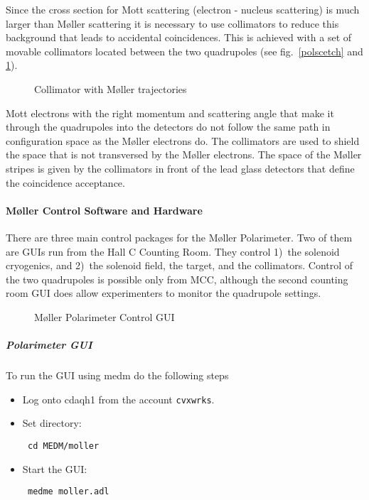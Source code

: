 Since the cross section for Mott scattering (electron - nucleus
scattering) is much larger than M\o ller scattering it is necessary
to use collimators to reduce this background that leads to accidental
coincidences. This is achieved with a set of movable collimators
located between the two quadrupoles (see fig.~\ref{polscetch} 
and \ref{colscetch}). 
%
\begin{figure}
\begin{center}
\caption{Collimator with M\o ller trajectories\label{colscetch}}
\end{center}
\end{figure}
Mott electrons with the right momentum and scattering angle that make it
through the quadrupoles into the detectors do not follow the same
path in configuration space as 
the M\o ller electrons do.  The collimators are used to shield the
space that is not transversed by the M\o ller electrons. The space of
the M\o ller stripes is  
given by the collimators in front of the lead glass detectors
that define the coincidence acceptance.
%

\paragraph{M\o ller Control Software and Hardware}
There are three main control packages for the M\o ller Polarimeter.
Two of them are GUIs run from the Hall C Counting Room. They
control 1)~the solenoid cryogenics, and 2)~the solenoid field, 
the target, and the collimators. Control of the two quadrupoles
is possible only from MCC, although the second counting room GUI does
allow experimenters to monitor the quadrupole settings.


\begin{figure}
  \begin{center}
  \caption{M\o ller Polarimeter Control GUI\label{molpolmedm}}
  \end{center}
\end{figure}
%

\subparagraph{Polarimeter GUI}

To run the GUI using medm do the following steps
\begin{itemize}
\item Log onto cdaqh1 from the account {\tt cvxwrks}.
\item Set directory: \begin{verbatim} cd MEDM/moller \end{verbatim}
\item Start the GUI: \begin{verbatim} medme moller.adl  \end{verbatim} 
\end{itemize}
%

